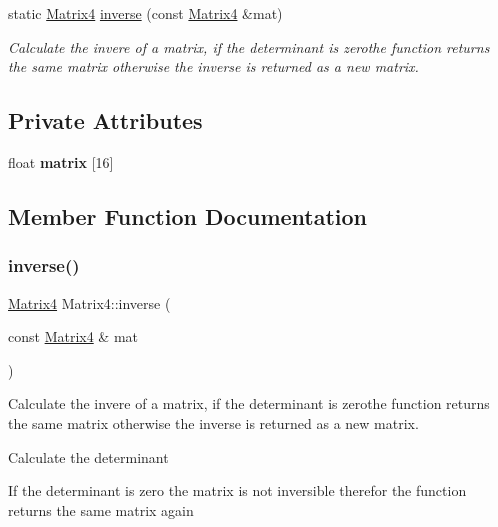 \begin{DoxyCompactItemize}
static \mbox{\hyperlink{class_matrix4}{Matrix4}} \mbox{\hyperlink{class_matrix4_ac023c2fde9c362babf91761f97d5b814}{inverse}} (const \mbox{\hyperlink{class_matrix4}{Matrix4}} \&mat)
\begin{DoxyCompactList}\small\item\em Calculate the invere of a matrix, if the determinant is zerothe function returns the same matrix otherwise the inverse is returned as a new matrix. \end{DoxyCompactList}\end{DoxyCompactItemize}
\subsection*{Private Attributes}
\begin{DoxyCompactItemize}
\item 
\mbox{\label{class_matrix4_a9e3075f101822993aae842e61c0eb529}} 
float {\bfseries matrix} \mbox{[}16\mbox{]}
\end{DoxyCompactItemize}


\subsection{Member Function Documentation}
\mbox{\label{class_matrix4_ac023c2fde9c362babf91761f97d5b814}} 
\subsubsection{\texorpdfstring{inverse()}{inverse()}}
{\footnotesize\ttfamily \mbox{\hyperlink{class_matrix4}{Matrix4}} Matrix4\+::inverse (\begin{DoxyParamCaption}\item[{const \mbox{\hyperlink{class_matrix4}{Matrix4}} \&}]{mat }\end{DoxyParamCaption})\hspace{0.3cm}{\ttfamily [static]}}



Calculate the invere of a matrix, if the determinant is zerothe function returns the same matrix otherwise the inverse is returned as a new matrix. 

Calculate the determinant

If the determinant is zero the matrix is not inversible therefor the function returns the same matrix again

